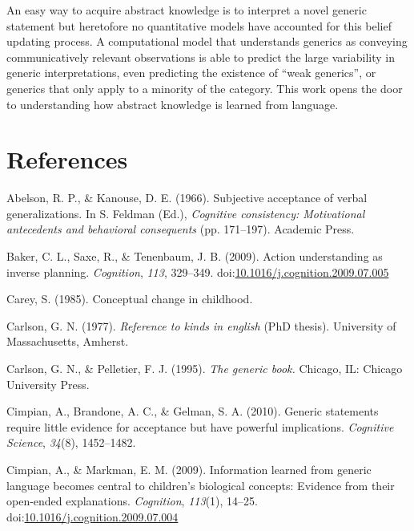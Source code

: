 \documentclass[floatsintext,doc]{apa6}
\begin{document}
An easy way to acquire abstract knowledge is to interpret a novel generic statement but heretofore no quantitative models have accounted for this belief updating process.
A computational model that understands generics as conveying communicatively relevant observations is able to predict the large variability in generic interpretations, even predicting the existence of \enquote{weak generics}, or generics that only apply to a minority of the category.
This work opens the door to understanding how abstract knowledge is learned from language.

\newpage

\hypertarget{references}{%
\section{References}\label{references}}

\hypertarget{refs}{}
\leavevmode\hypertarget{ref-Abelson1966}{}%
Abelson, R. P., \& Kanouse, D. E. (1966). Subjective acceptance of verbal generalizations. In S. Feldman (Ed.), \emph{Cognitive consistency: Motivational antecedents and behavioral consequents} (pp. 171--197). Academic Press.

\leavevmode\hypertarget{ref-Baker2009}{}%
Baker, C. L., Saxe, R., \& Tenenbaum, J. B. (2009). Action understanding as inverse planning. \emph{Cognition}, \emph{113}, 329--349. doi:\href{https://doi.org/10.1016/j.cognition.2009.07.005}{10.1016/j.cognition.2009.07.005}

\leavevmode\hypertarget{ref-carey1985conceptual}{}%
Carey, S. (1985). Conceptual change in childhood.

\leavevmode\hypertarget{ref-Carlson1977}{}%
Carlson, G. N. (1977). \emph{Reference to kinds in english} (PhD thesis). University of Massachusetts, Amherst.

\leavevmode\hypertarget{ref-Carlson1995}{}%
Carlson, G. N., \& Pelletier, F. J. (1995). \emph{The generic book.} Chicago, IL: Chicago University Press.

\leavevmode\hypertarget{ref-Cimpian2010}{}%
Cimpian, A., Brandone, A. C., \& Gelman, S. A. (2010). Generic statements require little evidence for acceptance but have powerful implications. \emph{Cognitive Science}, \emph{34}(8), 1452--1482.

\leavevmode\hypertarget{ref-Cimpian2009:explanations}{}%
Cimpian, A., \& Markman, E. M. (2009). Information learned from generic language becomes central to children's biological concepts: Evidence from their open-ended explanations. \emph{Cognition}, \emph{113}(1), 14--25. doi:\href{https://doi.org/10.1016/j.cognition.2009.07.004}{10.1016/j.cognition.2009.07.004}
\end{document}
